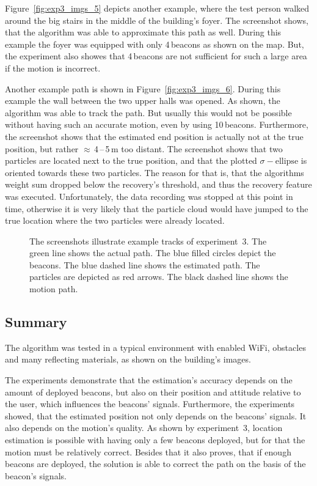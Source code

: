 Figure~\ref{fig:exp3_imgs_5} depicts another example, where the test person walked around the big stairs in the middle of the building's foyer. The screenshot shows, that the algorithm was able to approximate this path as well. During this example the foyer was equipped with only 4\,beacons as shown on the map. But, the experiment also showes that 4\,beacons are not sufficient for such a large area if the motion is incorrect.

Another example path is shown in Figure~\ref{fig:exp3_imgs_6}. During this example the wall between the two upper halls was opened. As shown, the algorithm was able to track the path. But usually this would not be possible without having such an accurate motion, even by using 10\,beacons. Furthermore, the screenshot shows that the estimated end position is actually not at the true position, but rather $\approx$\,4\,--\,5\,m too distant. The screenshot shows that two particles are located next to the true position, and that the plotted $\sigma-\text{ellipse}$ is oriented towards these two particles. The reason for that is, that the algorithms weight sum dropped below the recovery's threshold, and thus the recovery feature was executed. Unfortunately, the data recording was stopped at this point in time, otherwise it is very likely that the particle cloud would have jumped to the true location where the two particles were already located. 

\begin{figure}
	
	\caption{The screenshots illustrate example tracks of experiment~3. The green line shows the actual path. The blue filled circles depict the beacons. The blue dashed line shows the estimated path. The particles are depicted as red arrows. The black dashed line shows the motion path.}
\end{figure}

\subsection*{Summary}
The algorithm was tested in a typical environment with enabled WiFi, obstacles and many reflecting materials, as shown on the building's images.

The experiments demonstrate that the estimation's accuracy depends on the amount of deployed beacons, but also on their position and attitude relative to the user, which influences the beacons' signals. Furthermore, the experiments showed, that the estimated position not only depends on the beacons' signals. It also depends on the motion's quality. As shown by experiment~3, location estimation is possible with having only a few beacons deployed, but for that the motion must be relatively correct. Besides that it also proves, that if enough beacons are deployed, the solution is able to correct the path on the basis of the beacon's signals.

